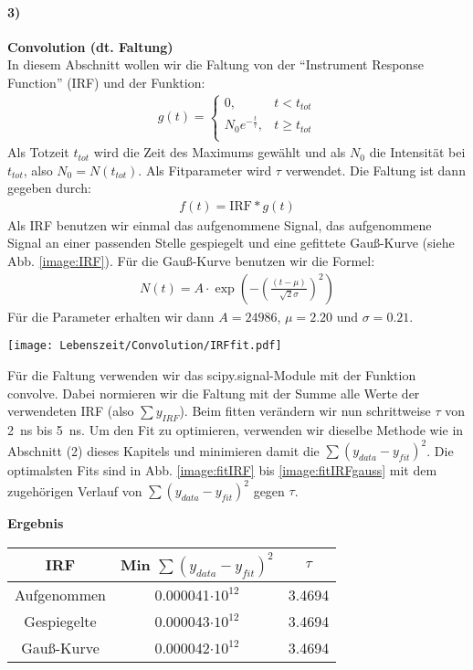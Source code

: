 \paragraph{3)}\textbf{Convolution (dt. Faltung)}\\
In diesem Abschnitt wollen wir die Faltung von der \enquote{Instrument Response Function} (IRF) und der Funktion:
\begin{gather}
    g(t) = 
    \begin{cases}
        0, & t < t_{tot} \\
        N_0 e^{-\frac{t}{\tau}}, & t \geq t_{tot} \\
    \end{cases}
\end{gather}
Als Totzeit $t_{tot}$ wird die Zeit des Maximums gewählt und als $N_0$ die Intensität bei $t_{tot}$, also $N_0 = N(t_{tot})$. Als Fitparameter wird $\tau$ verwendet. Die Faltung ist dann gegeben durch:
\begin{gather}
    f(t) = \text{IRF} * g(t)
\end{gather}
Als IRF benutzen wir einmal das aufgenommene Signal, das aufgenommene Signal an einer passenden Stelle gespiegelt und eine gefittete Gauß-Kurve (siehe Abb. \ref{image:IRF}). Für die Gauß-Kurve benutzen wir die Formel:
\begin{gather}
    N(t) = A \cdot\exp(-\left(\frac{(t-\mu)}{\sqrt{2}\sigma}\right)^2)
\end{gather}
Für die Parameter erhalten wir dann $A = 24986$, $\mu = 2.20$ und $\sigma = 0.21$.
\begin{center}
    \texttt{[image: Lebenszeit/Convolution/IRFfit.pdf]}
    \label{image:IRF}
\end{center}
\newpage
Für die Faltung verwenden wir das scipy.signal-Module mit der Funktion convolve. Dabei normieren wir die Faltung mit der Summe alle Werte der verwendeten IRF (also $\sum y_{IRF}$). Beim fitten verändern wir nun schrittweise $\tau$ von \SI{2}{\nano\second} bis \SI{5}{\nano\second}. Um den Fit zu optimieren, verwenden wir dieselbe Methode wie in Abschnitt (2) dieses Kapitels und minimieren damit die $\sum(y_{data}-y_{fit})^2$. Die optimalsten Fits sind in Abb. \ref{image:fitIRF} bis \ref{image:fitIRFgauss} mit dem zugehörigen Verlauf von $\sum(y_{data}-y_{fit})^2$ gegen $\tau$.
\begin{center}
    \textbf{Ergebnis}\\[0,2cm]
    \begin{tabular}{c | c c}
        IRF & Min $\sum(y_{data}-y_{fit})^2$ & $\tau$ \\
        \hline
        Aufgenommen & 0.000041$\cdot10^{12}$ & 3.4694 \\
        Gespiegelte & 0.000043$\cdot10^{12}$ & 3.4694 \\
        Gauß-Kurve  & 0.000042$\cdot10^{12}$ & 3.4694 \\
    \end{tabular}
\end{center}
